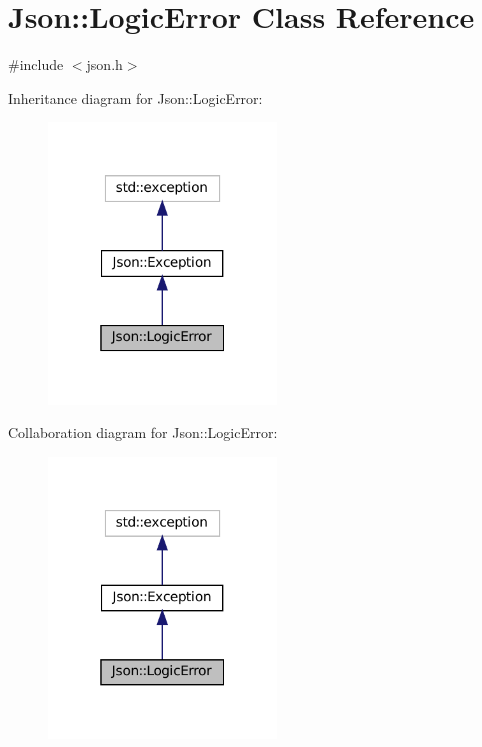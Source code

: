\hypertarget{classJson_1_1LogicError}{}\section{Json\+:\+:Logic\+Error Class Reference}
\label{classJson_1_1LogicError}


{\ttfamily \#include $<$json.\+h$>$}



Inheritance diagram for Json\+:\+:Logic\+Error\+:
\nopagebreak
\begin{figure}[H]
\begin{center}
\leavevmode
\includegraphics[width=172pt]{classJson_1_1LogicError__inherit__graph}
\end{center}
\end{figure}


Collaboration diagram for Json\+:\+:Logic\+Error\+:
\nopagebreak
\begin{figure}[H]
\begin{center}
\leavevmode
\includegraphics[width=172pt]{classJson_1_1LogicError__coll__graph}
\end{center}
\end{figure}
